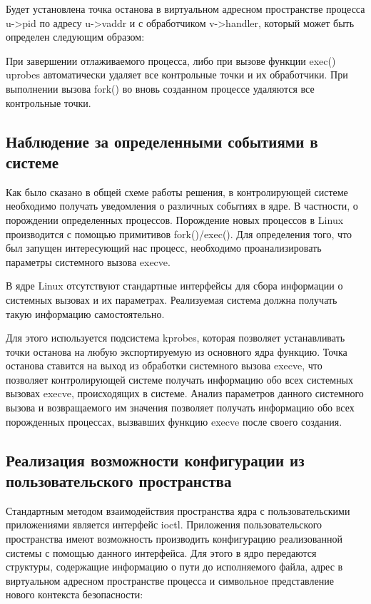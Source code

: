 

Будет установлена точка останова в виртуальном адресном пространстве 
процесса u->pid по адресу u->vaddr и с обработчиком v->handler, который
 может быть определен следующим образом: 



При завершении отлаживаемого процесса, либо при вызове функции exec() 
uprobes автоматически удаляет все контрольные точки и их обработчики. 
При выполнении вызова fork() во вновь созданном процессе удаляются все 
контрольные точки. 

\subsection{Наблюдение за определенными событиями в системе}

Как было сказано в общей схеме работы решения, в контролирующей
системе необходимо получать уведомления о различных событиях в
ядре. В частности, о порождении определенных процессов.
Порождение новых процессов в Linux производится с помощью
примитивов fork()/exec(). Для определения того, что был запущен
интересующий нас процесс, необходимо проанализировать параметры
системного вызова execve.

В ядре Linux отсутствуют стандартные интерфейсы для сбора
информации о системных вызовах и их параметрах.
Реализуемая система должна получать такую информацию самостоятельно.

Для этого используется подсистема kprobes, которая
позволяет устанавливать точки останова на любую экспортируемую из
основного ядра функцию. Точка останова ставится на выход из обработки
системного вызова execve, что позволяет контролирующей системе получать
информацию обо всех системных вызовах execve, происходящих в системе.
Анализ параметров данного системного вызова и возвращаемого им значения
позволяет получать информацию обо всех порожденных процессах, вызвавших
функцию execve после своего создания.  
\subsection{Реализация возможности конфигурации из пользовательского пространства}
\label{contpoints}

Стандартным методом взаимодействия пространства ядра с пользовательскими
приложениями является интерфейс ioctl. Приложения пользовательского
пространства имеют возможность производить конфигурацию реализованной
системы с помощью данного интерфейса. Для этого в ядро передаются
структуры, содержащие информацию о пути до исполняемого файла, адрес
в виртуальном адресном пространстве процесса и символьное представление
нового контекста безопасности:

